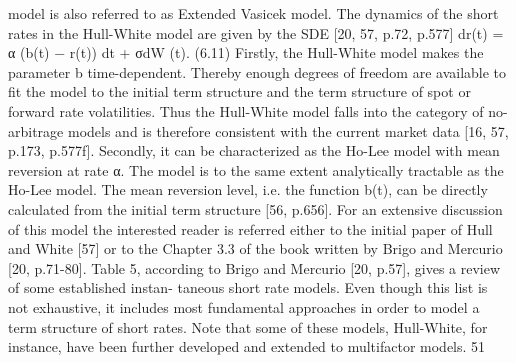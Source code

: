 model is also referred to as Extended Vasicek model. The dynamics of the short rates in the Hull-White model are given by the SDE [20, 57, p.72, p.577]
dr(t) = α (b(t) − r(t)) dt + σdW (t). (6.11)
Firstly, the Hull-White model makes the parameter b time-dependent. Thereby enough degrees of freedom are available to fit the model to the initial term structure and the term structure of spot or forward rate volatilities. Thus the Hull-White model falls into the category of no- arbitrage models and is therefore consistent with the current market data [16, 57, p.173, p.577f]. Secondly, it can be characterized as the Ho-Lee model with mean reversion at rate α. The model is to the same extent analytically tractable as the Ho-Lee model. The mean reversion level, i.e. the function b(t), can be directly calculated from the initial term structure [56, p.656].
For an extensive discussion of this model the interested reader is referred either to the initial paper of Hull and White [57] or to the Chapter 3.3 of the book written by Brigo and Mercurio [20, p.71-80].
Table 5, according to Brigo and Mercurio [20, p.57], gives a review of some established instan- taneous short rate models. Even though this list is not exhaustive, it includes most fundamental approaches in order to model a term structure of short rates. Note that some of these models, Hull-White, for instance, have been further developed and extended to multifactor models.
51

